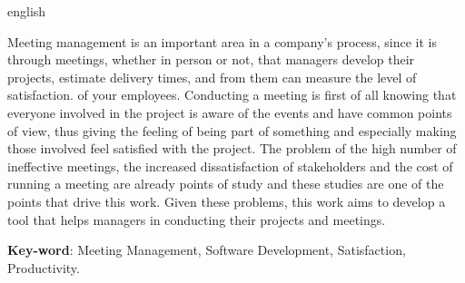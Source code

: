 \begin{resumo}[Abstract]
 \begin{otherlanguage*}{english}

  Meeting management is an important area in a company's process, since it is through meetings, whether in person or not, that managers develop their projects, estimate delivery times, and from them can measure the level of satisfaction. of your employees. Conducting a meeting is first of all knowing that everyone involved in the project is aware of the events and have common points of view, thus giving the feeling of being part of something and especially making those involved feel satisfied with the project. The problem of the high number of ineffective meetings, the increased dissatisfaction of stakeholders and the cost of running a meeting are already points of study and these studies are one of the points that drive this work. Given these problems, this work aims to develop a tool that helps managers in conducting their projects and meetings.

   \vspace{\onelineskip}

   \noindent
   \textbf{Key-word}: Meeting Management, Software Development, Satisfaction, Productivity.
 \end{otherlanguage*}
\end{resumo}
